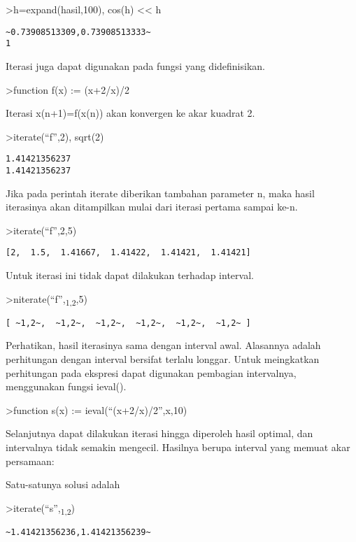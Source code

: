 \documentclass[
]{book}
\begin{document}
\textgreater h=expand(hasil,100), cos(h) \textless\textless{} h

\begin{verbatim}
~0.73908513309,0.73908513333~
1
\end{verbatim}

Iterasi juga dapat digunakan pada fungsi yang didefinisikan.

\textgreater function f(x) := (x+2/x)/2

Iterasi x(n+1)=f(x(n)) akan konvergen ke akar kuadrat 2.

\textgreater iterate(``f'',2), sqrt(2)

\begin{verbatim}
1.41421356237
1.41421356237
\end{verbatim}

Jika pada perintah iterate diberikan tambahan parameter n, maka hasil iterasinya akan ditampilkan mulai dari iterasi pertama sampai ke-n.

\textgreater iterate(``f'',2,5)

\begin{verbatim}
[2,  1.5,  1.41667,  1.41422,  1.41421,  1.41421]
\end{verbatim}

Untuk iterasi ini tidak dapat dilakukan terhadap interval.

\textgreater niterate(``f'',\textsubscript{1,2},5)

\begin{verbatim}
[ ~1,2~,  ~1,2~,  ~1,2~,  ~1,2~,  ~1,2~,  ~1,2~ ]
\end{verbatim}

Perhatikan, hasil iterasinya sama dengan interval awal. Alasannya adalah perhitungan dengan interval bersifat terlalu longgar. Untuk meingkatkan perhitungan pada ekspresi dapat digunakan pembagian intervalnya, menggunakan fungsi ieval().

\textgreater function s(x) := ieval(``(x+2/x)/2'',x,10)

Selanjutnya dapat dilakukan iterasi hingga diperoleh hasil optimal, dan intervalnya tidak semakin mengecil. Hasilnya berupa interval yang memuat akar persamaan:

Satu-satunya solusi adalah

\textgreater iterate(``s'',\textsubscript{1,2})

\begin{verbatim}
~1.41421356236,1.41421356239~
\end{verbatim}
\end{document}
